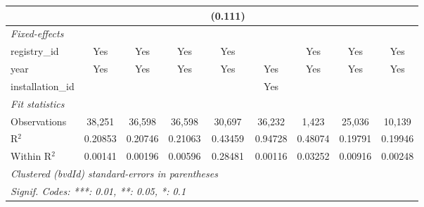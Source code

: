 \begin{tabular}{lcccccccc}
                                              &         &         &                & (0.111)        &              &            &                &   \\   
   \midrule
   \emph{Fixed-effects}\\
   registry\_id                               & Yes     & Yes     & Yes            & Yes            &              & Yes        & Yes            & Yes\\  
   year                                       & Yes     & Yes     & Yes            & Yes            & Yes          & Yes        & Yes            & Yes\\  
   installation\_id                           &         &         &                &                & Yes          &            &                & \\  
   \midrule
   \emph{Fit statistics}\\
   Observations                               & 38,251  & 36,598  & 36,598         & 30,697         & 36,232       & 1,423      & 25,036         & 10,139\\  
   R$^2$                                      & 0.20853 & 0.20746 & 0.21063        & 0.43459        & 0.94728      & 0.48074    & 0.19791        & 0.19946\\  
   Within R$^2$                               & 0.00141 & 0.00196 & 0.00596        & 0.28481        & 0.00116      & 0.03252    & 0.00916        & 0.00248\\  
   \midrule \midrule
   \multicolumn{9}{l}{\emph{Clustered (bvdId) standard-errors in parentheses}}\\
   \multicolumn{9}{l}{\emph{Signif. Codes: ***: 0.01, **: 0.05, *: 0.1}}\\
\end{tabular}
\par\endgroup


